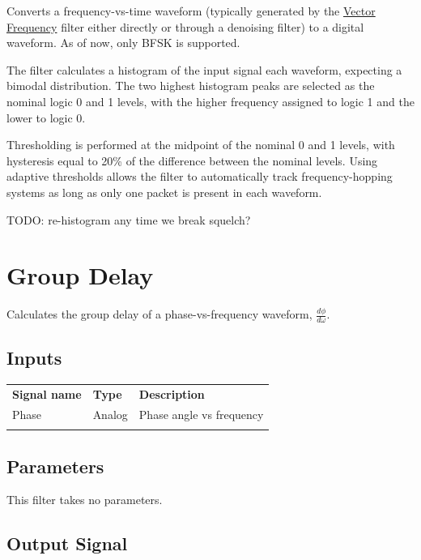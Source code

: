 Converts a frequency-vs-time waveform (typically generated by the \hyperref[filter:vector_frequency]{Vector Frequency}
filter either directly or through a denoising filter) to a digital waveform. As of now, only BFSK is supported.

The filter calculates a histogram of the input signal each waveform, expecting a bimodal distribution. The two highest
histogram peaks are selected as the nominal logic 0 and 1 levels, with the higher frequency assigned to logic 1 and the
lower to logic 0.

Thresholding is performed at the midpoint of the nominal 0 and 1 levels, with hysteresis equal to 20\% of the
difference between the nominal levels. Using adaptive thresholds allows the filter to automatically track
frequency-hopping systems as long as only one packet is present in each waveform.

TODO: re-histogram any time we break squelch?

\pagebreak
\section{Group Delay}
\label{filter:groupdelay}

Calculates the group delay of a phase-vs-frequency waveform, $\frac{d\phi}{d\omega}$.

\subsection{Inputs}

\begin{tabularx}{16cm}{llX}
\thickhline
\textbf{Signal name} & \textbf{Type} & \textbf{Description} \\
\thickhline
Phase & Analog & Phase angle vs frequency\\
\thickhline
\end{tabularx}

\subsection{Parameters}

This filter takes no parameters.

\subsection{Output Signal}

